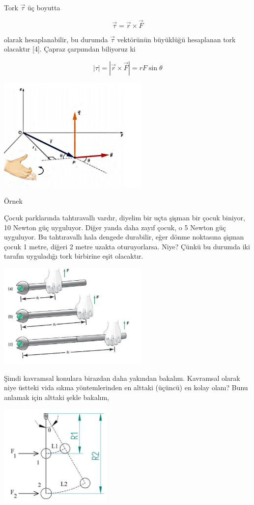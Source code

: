\documentclass[12pt,fleqn]{article}\usepackage{../../common}
\begin{document}
Tork $\vec{\tau}$ üç boyutta

$$
\vec{\tau} = \vec{r} \times \vec{F}
$$

olarak hesaplanabilir, bu durumda $\vec{\tau}$ vektörünün büyüklüğü hesaplanan
tork olacaktır [4]. Çapraz çarpımdan biliyoruz ki

$$
|\tau| = | \vec{r} \times \vec{F} | = r F \sin\theta
$$

\includegraphics[width=20em]{phy_005_basics_02_04.jpg}

Örnek

Çocuk parklarında tahtıravallı vardır, diyelim bir uçta şişman bir çocuk
biniyor, 10 Newton güç uyguluyor. Diğer yanda daha zayıf çocuk, o 5 Newton
güç uyguluyor. Bu tahtıravallı hala dengede durabilir, eğer dönme noktasına
şişman çocuk 1 metre, diğeri 2 metre uzakta oturuyorlarsa. Niye? Çünkü bu
durumda iki tarafın uyguladığı tork birbirine eşit olacaktır.

\includegraphics[width=20em]{phy_005_basics_02_07.jpg}

Şimdi kavramsal konulara birazdan daha yakından bakalım. Kavramsal olarak niye
üstteki vida sıkma yöntemlerinden en alttaki (üçüncü) en kolay olanı? Bunu
anlamak için alttaki şekle bakalım,

\includegraphics[width=15em]{phy_005_basics_02_13.jpg}
\end{document}
